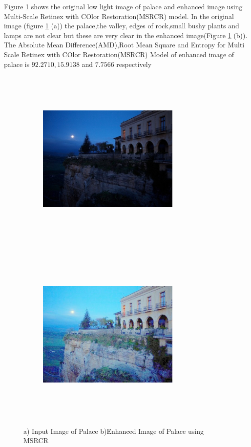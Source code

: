 Figure \ref{fig:msrcrPalace} shows the original low light image of palace and enhanced image using Multi-Scale Retinex with COlor Restoration(MSRCR) model. In the original image (figure \ref{fig:msrcrPalace} (a))  the palace,the valley, edges of rock,small bushy plants and lamps are not clear but these are very clear in the enhanced image(Figure \ref{fig:msrcrPalace} (b)). The Absolute Mean Difference(AMD),Root Mean Square and Entropy for Multi Scale Retinex with COlor Restoration(MSRCR) Model of enhanced image of palace is $92.2710, 15.9138$ and $7.7566$ respectively      

\begin{figure}[!htb]
	\begin{subfigure}{8cm}
		\centering    
    	\includegraphics[width=7cm,height=9cm,keepaspectratio]{images/ch5/palace_input.jpg}
    	\caption{} 
    \end{subfigure}
  	\begin{subfigure}{6cm}
  		\centering
  		\includegraphics[width=7cm,height=9cm,keepaspectratio]{images/ch5/palace_msrcr.jpg}
   		\caption{}
  	\end{subfigure}
  	\caption{a) Input Image of Palace b)Enhanced Image of Palace using MSRCR}
  	\label{fig:msrcrPalace}
\end{figure}


